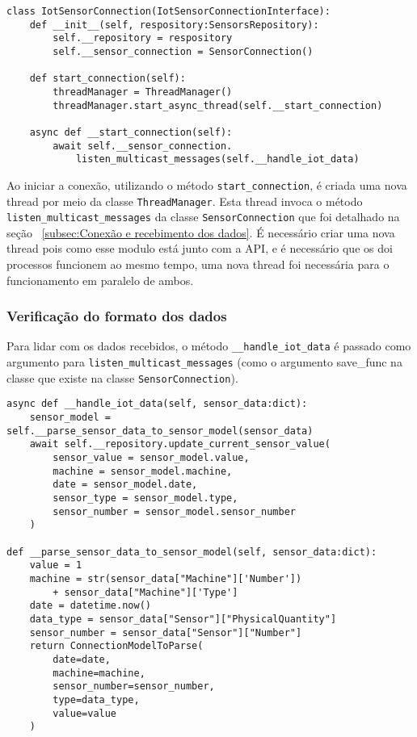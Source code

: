 \begin{verbatim}
class IotSensorConnection(IotSensorConnectionInterface):
    def __init__(self, respository:SensorsRepository):
        self.__repository = respository
        self.__sensor_connection = SensorConnection()
    
    def start_connection(self):
        threadManager = ThreadManager()
        threadManager.start_async_thread(self.__start_connection)
    
    async def __start_connection(self):
        await self.__sensor_connection.
            listen_multicast_messages(self.__handle_iot_data)
\end{verbatim}

Ao iniciar a conexão, utilizando o método \texttt{start\_connection}, é criada uma nova thread por meio da classe \texttt{ThreadManager}. Esta thread invoca o método \texttt{listen\_multicast\_messages} da classe \texttt{SensorConnection} que foi detalhado na seção ~\ref{subsec:Conexão e recebimento dos dados}. É necessário criar uma nova thread pois como esse modulo está junto com a API, e é necessário que os doi processos funcionem ao mesmo tempo, uma nova thread foi necessária para o funcionamento em paralelo de ambos.

\subsubsection{Verificação do formato dos dados}

Para lidar com os dados recebidos, o método \texttt{\_\_handle\_iot\_data} é passado como argumento para \texttt{listen\_multicast\_messages} (como o argumento save\_func na classe que existe na classe \texttt{SensorConnection}).

\begin{verbatim}
async def __handle_iot_data(self, sensor_data:dict):
    sensor_model = self.__parse_sensor_data_to_sensor_model(sensor_data)
    await self.__repository.update_current_sensor_value(
        sensor_value = sensor_model.value,
        machine = sensor_model.machine,
        date = sensor_model.date,
        sensor_type = sensor_model.type,
        sensor_number = sensor_model.sensor_number
    )

def __parse_sensor_data_to_sensor_model(self, sensor_data:dict):
    value = 1
    machine = str(sensor_data["Machine"]['Number']) 
        + sensor_data["Machine"]['Type']
    date = datetime.now()
    data_type = sensor_data["Sensor"]["PhysicalQuantity"]
    sensor_number = sensor_data["Sensor"]["Number"]
    return ConnectionModelToParse(
        date=date,
        machine=machine,
        sensor_number=sensor_number,
        type=data_type,
        value=value
    )
\end{verbatim}

